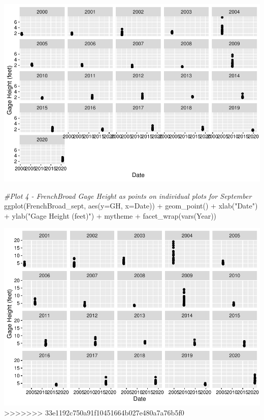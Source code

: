 \documentclass[
  12pt,
]{article}
\newenvironment{Shaded}{\begin{snugshade}}{\end{snugshade}}
\newcommand{\AttributeTok}[1]{\textcolor[rgb]{0.77,0.63,0.00}{#1}}
\newcommand{\CommentTok}[1]{\textcolor[rgb]{0.56,0.35,0.01}{\textit{#1}}}
\newcommand{\FunctionTok}[1]{\textcolor[rgb]{0.00,0.00,0.00}{#1}}
\newcommand{\NormalTok}[1]{#1}
\newcommand{\SpecialCharTok}[1]{\textcolor[rgb]{0.00,0.00,0.00}{#1}}
\newcommand{\StringTok}[1]{\textcolor[rgb]{0.31,0.60,0.02}{#1}}
\begin{document}
\includegraphics{Project_Template_files/figure-latex/Plots-3.pdf}

\begin{Shaded}
\begin{Highlighting}[]
\CommentTok{\#Plot 4 {-} FrenchBroad Gage Height as points on individual plots for September}
\FunctionTok{ggplot}\NormalTok{(FrenchBroad\_sept, }\FunctionTok{aes}\NormalTok{(}\AttributeTok{y=}\NormalTok{GH, }\AttributeTok{x=}\NormalTok{Date)) }\SpecialCharTok{+}
  \FunctionTok{geom\_point}\NormalTok{() }\SpecialCharTok{+}
  \FunctionTok{xlab}\NormalTok{(}\StringTok{"Date"}\NormalTok{) }\SpecialCharTok{+}
  \FunctionTok{ylab}\NormalTok{(}\StringTok{"Gage Height (feet)"}\NormalTok{) }\SpecialCharTok{+}
\NormalTok{  mytheme }\SpecialCharTok{+}
  \FunctionTok{facet\_wrap}\NormalTok{(}\FunctionTok{vars}\NormalTok{(Year)) }
\end{Highlighting}
\end{Shaded}

\includegraphics{Project_Template_files/figure-latex/Plots-4.pdf}
>>>>>>> 33e1192c750a91f10451664b027e480a7a76b5f0
\end{document}
